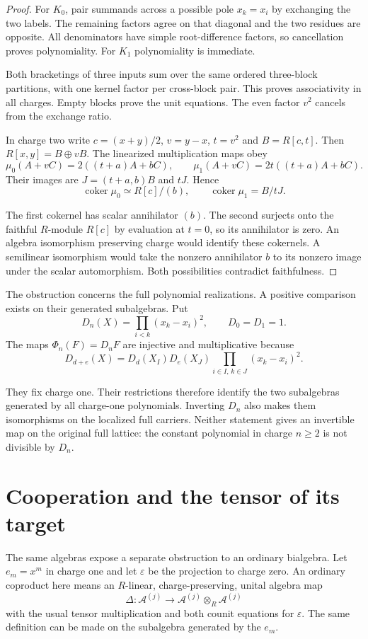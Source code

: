 \begin{proof}
For $K_0$, pair summands across a possible pole $x_k=x_i$ by
exchanging the two labels. The remaining factors agree on that
diagonal and the two residues are opposite. All denominators have
simple root-difference factors, so cancellation proves polynomiality.
For $K_1$ polynomiality is immediate.

Both bracketings of three inputs
sum over the same ordered three-block partitions, with one kernel
factor per cross-block pair. This proves associativity in all charges.
Empty blocks prove the unit equations. The even factor $v^2$ cancels
from the exchange ratio.

In charge two write $c=(x+y)/2$, $v=y-x$, $t=v^2$ and $B=R[c,t]$.
Then $R[x,y]=B\oplus vB$. The linearized multiplication maps obey
\[
 \mu_0(A+vC)=2((t+a)A+bC),\qquad
 \mu_1(A+vC)=2t((t+a)A+bC).
\]
Their images are $J=(t+a,b)B$ and $tJ$. Hence
\[
 \operatorname{coker}\mu_0\simeq R[c]/(b),\qquad
 \operatorname{coker}\mu_1=B/tJ.
\]

The first cokernel has scalar annihilator $(b)$. The second surjects
onto the faithful $R$-module $R[c]$ by evaluation at $t=0$, so its
annihilator is zero. An algebra isomorphism preserving charge would
identify these cokernels. A semilinear isomorphism would take the
nonzero annihilator $b$ to its nonzero image under the scalar
automorphism. Both possibilities contradict faithfulness.
\end{proof}

The obstruction concerns the full polynomial realizations. A positive
comparison exists on their generated subalgebras. Put
\[
 D_n(X)=\prod_{i<k}(x_k-x_i)^2,\qquad D_0=D_1=1.
\]
The maps $\Phi_n(F)=D_nF$ are injective and multiplicative because
\[
 D_{d+e}(X)=D_d(X_I)D_e(X_J)
                   \prod_{i\in I,\,k\in J}(x_k-x_i)^2.
\]

They fix charge one. Their restrictions therefore identify the two
subalgebras generated by all charge-one polynomials. Inverting $D_n$
also makes them isomorphisms on the localized full carriers. Neither
statement gives an invertible map on the original full lattice:
the constant polynomial in charge $n\geq2$ is not divisible by $D_n$.

\section{Cooperation and the tensor of its target}

The same algebras expose a separate obstruction to an ordinary
bialgebra. Let $e_m=x^m$ in charge one and let $\varepsilon$ be the
projection to charge zero. An ordinary coproduct here means an
$R$-linear, charge-preserving, unital algebra map
\[
 \Delta:\mathcal A^{(j)}\longrightarrow
                \mathcal A^{(j)}\otimes_R\mathcal A^{(j)}
\]
with the usual tensor multiplication and both counit equations for
$\varepsilon$. The same definition can be made on the subalgebra
generated by the $e_m$.

